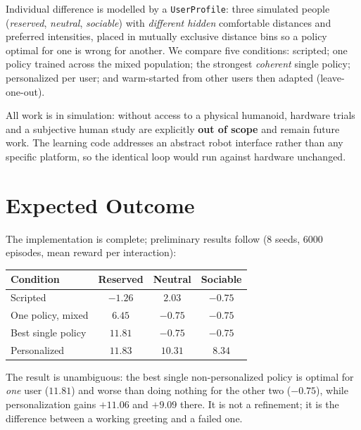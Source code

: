 \documentclass[conference,a4paper]{IEEEtran}
\begin{document}
Individual difference is modelled by a \texttt{UserProfile}: three simulated people
(\emph{reserved}, \emph{neutral}, \emph{sociable}) with \emph{different hidden}
comfortable distances and preferred intensities, placed in mutually exclusive
distance bins so a policy optimal for one is wrong for another. We compare five
conditions: scripted; one policy trained across the mixed population; the
strongest \emph{coherent} single policy; personalized per user; and warm-started
from other users then adapted (leave-one-out).

All work is in simulation: without access to a physical humanoid, hardware trials
and a subjective human study are explicitly \textbf{out of scope} and remain future
work. The learning code addresses an abstract robot interface rather than any
specific platform, so the identical loop would run against hardware unchanged.

\section{Expected Outcome}

The implementation is complete; preliminary results follow (8 seeds, 6000
episodes, mean reward per interaction):

\vspace{-0.8em}
\begin{table}[h]
\centering
\scriptsize
\begin{tabular}{@{}lccc@{}}
\toprule
\textbf{Condition} & \textbf{Reserved} & \textbf{Neutral} & \textbf{Sociable} \\
\midrule
Scripted            & $-1.26$          & $2.03$           & $-0.75$ \\
One policy, mixed   & $6.45$           & $-0.75$          & $-0.75$ \\
Best single policy  & $\mathbf{11.81}$ & $-0.75$          & $-0.75$ \\
Personalized        & $\mathbf{11.83}$ & $\mathbf{10.31}$ & $\mathbf{8.34}$ \\
\bottomrule
\end{tabular}
\end{table}
\vspace{-1.2em}

The result is unambiguous: the best single non-personalized policy is optimal for
\emph{one} user ($11.81$) and worse than doing nothing for the other two ($-0.75$),
while personalization gains $+11.06$ and $+9.09$ there. It is not a refinement; it
is the difference between a working greeting and a failed one.
\end{document}
